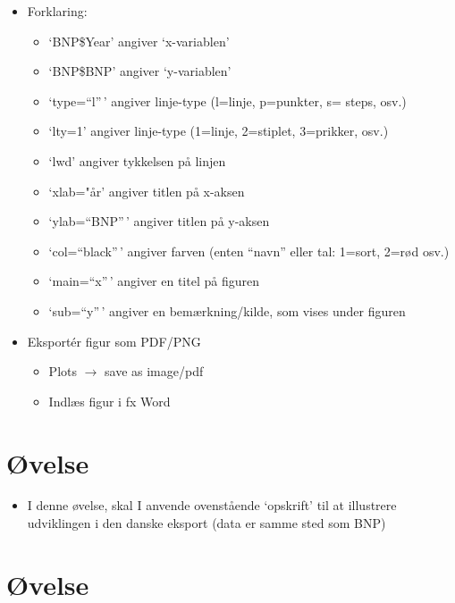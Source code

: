 \documentclass[
  12pt,
]{article}
\providecommand{\tightlist}{%
  \setlength{\itemsep}{0pt}\setlength{\parskip}{0pt}}
\begin{document}
\begin{itemize}
\tightlist
\item
  Forklaring:

  \begin{itemize}
  \tightlist
  \item
    `BNP\$Year' angiver `x-variablen'
  \item
    `BNP\$BNP' angiver `y-variablen'
  \item
    `type=``l''\,' angiver linje-type (l=linje, p=punkter, s= steps,
    osv.)
  \item
    `lty=1' angiver linje-type (1=linje, 2=stiplet, 3=prikker, osv.)
  \item
    `lwd' angiver tykkelsen på linjen
  \item
    `xlab="år' angiver titlen på x-aksen
  \item
    `ylab=``BNP''\,' angiver titlen på y-aksen
  \item
    `col=``black''\,' angiver farven (enten ``navn'' eller tal: 1=sort,
    2=rød osv.)
  \item
    `main=``x''\,' angiver en titel på figuren
  \item
    `sub=``y''\,' angiver en bemærkning/kilde, som vises under figuren
  \end{itemize}
\item
  Eksportér figur som PDF/PNG

  \begin{itemize}
  \tightlist
  \item
    Plots \(\rightarrow\) save as image/pdf
  \item
    Indlæs figur i fx Word
  \end{itemize}
\end{itemize}

\hypertarget{uxf8velse}{%
\section{Øvelse}\label{uxf8velse}}

\begin{itemize}
\tightlist
\item
  I denne øvelse, skal I anvende ovenstående `opskrift' til at
  illustrere udviklingen i den danske eksport (data er samme sted som
  BNP)
\end{itemize}

\hypertarget{uxf8velse-1}{%
\section{Øvelse}\label{uxf8velse-1}}
\end{document}
